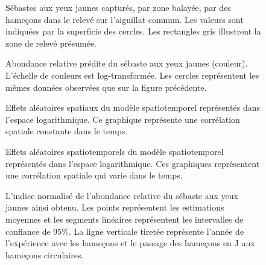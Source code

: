 \documentclass[french,11pt]{book}
\begin{document}
\clearpage
\begin{figure}[htb]

{\centering {} 

}

\caption{Sébastes aux yeux jaunes capturés, par zone balayée, par des hameçons dans le relevé sur l’aiguillat commun. Les valeurs sont indiquées par la superficie des cercles. Les rectangles gris illustrent la zone de relevé présumée.}\label{fig:dog-raw}
\end{figure}
\begin{figure}[htb]

{\centering {} 

}

\caption{Abondance relative prédite du sébaste aux yeux jaunes (couleur). L’échelle de couleurs est log-transformée. Les cercles représentent les mêmes données observées que sur la figure précédente.}\label{fig:dog-prediction}
\end{figure}
\begin{figure}[htb]

{\centering {} 

}

\caption{Effets aléatoires spatiaux du modèle spatiotemporel représentés dans l’espace logarithmique. Ce graphique représente une corrélation spatiale constante dans le temps.}\label{fig:dog-spatial}
\end{figure}
\begin{figure}[htb]

{\centering {} 

}

\caption{Effets aléatoires spatiotemporels du modèle spatiotemporel représentés dans l’espace logarithmique. Ces graphiques représentent une corrélation spatiale qui varie dans le temps.}\label{fig:dog-spatiotemporal}
\end{figure}
\begin{figure}[htb]

{\centering {} 

}

\caption{L’indice normalisé de l’abondance relative du sébaste aux yeux jaunes ainsi obtenu. Les points représentent les estimations moyennes et les segments linéaires représentent les intervalles de confiance de 95\%. La ligne verticale tiretée représente l’année de l’expérience avec les hameçons et le passage des hameçons en J aux hameçons circulaires.}\label{fig:dog-standardized-index}
\end{figure}
\clearpage
\end{document}
